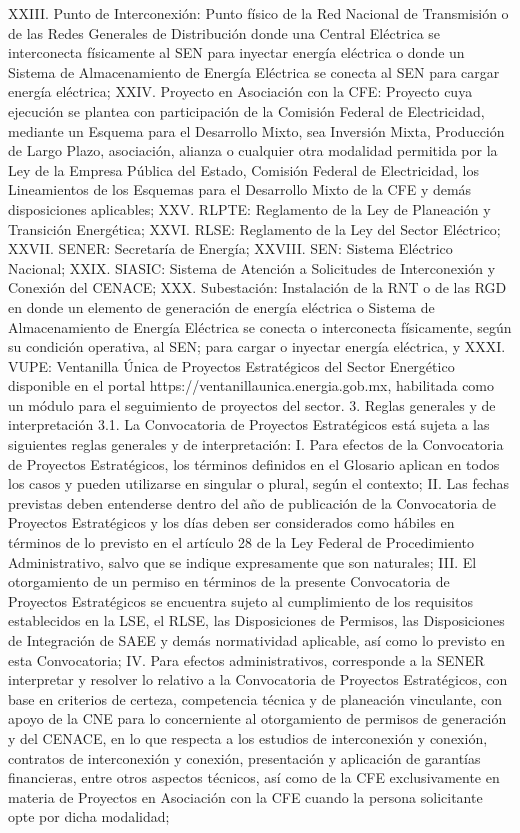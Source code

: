 XXIII. Punto de Interconexión: Punto físico de la Red Nacional de Transmisión o de las Redes Generales de Distribución donde una Central Eléctrica se interconecta físicamente al SEN para inyectar energía eléctrica o donde un Sistema de Almacenamiento de Energía Eléctrica se conecta al SEN para cargar energía eléctrica;
XXIV. Proyecto en Asociación con la CFE: Proyecto cuya ejecución se plantea con participación de la Comisión Federal de Electricidad, mediante un Esquema para el Desarrollo Mixto, sea Inversión Mixta, Producción de Largo Plazo, asociación, alianza o cualquier otra modalidad permitida por la Ley de la Empresa Pública del Estado, Comisión Federal de Electricidad, los Lineamientos de los Esquemas para el Desarrollo Mixto de la CFE y demás disposiciones aplicables;
XXV. RLPTE: Reglamento de la Ley de Planeación y Transición Energética;
XXVI. RLSE: Reglamento de la Ley del Sector Eléctrico;
XXVII. SENER: Secretaría de Energía;
XXVIII. SEN: Sistema Eléctrico Nacional;
XXIX. SIASIC: Sistema de Atención a Solicitudes de Interconexión y Conexión del CENACE;
XXX. Subestación: Instalación de la RNT o de las RGD en donde un elemento de generación de energía eléctrica o Sistema de Almacenamiento de Energía Eléctrica se conecta o interconecta físicamente, según su condición operativa, al SEN; para cargar o inyectar energía eléctrica, y
XXXI. VUPE: Ventanilla Única de Proyectos Estratégicos del Sector Energético disponible en el portal https://ventanillaunica.energia.gob.mx, habilitada como un módulo para el seguimiento de proyectos del sector.
3. Reglas generales y de interpretación
3.1. La Convocatoria de Proyectos Estratégicos está sujeta a las siguientes reglas generales y de interpretación:
I. Para efectos de la Convocatoria de Proyectos Estratégicos, los términos definidos en el Glosario aplican en todos los casos y pueden utilizarse en singular o plural, según el contexto;
II. Las fechas previstas deben entenderse dentro del año de publicación de la Convocatoria de Proyectos Estratégicos y los días deben ser considerados como hábiles en términos de lo previsto en el artículo 28 de la Ley Federal de Procedimiento Administrativo, salvo que se indique expresamente que son naturales;
III. El otorgamiento de un permiso en términos de la presente Convocatoria de Proyectos Estratégicos se encuentra sujeto al cumplimiento de los requisitos establecidos en la LSE, el RLSE, las Disposiciones de Permisos, las Disposiciones de Integración de SAEE y demás normatividad aplicable, así como lo previsto en esta Convocatoria;
IV. Para efectos administrativos, corresponde a la SENER interpretar y resolver lo relativo a la Convocatoria de Proyectos Estratégicos, con base en criterios de certeza, competencia técnica y de planeación vinculante, con apoyo de la CNE para lo concerniente al otorgamiento de permisos de generación y del CENACE, en lo que respecta a los estudios de interconexión y conexión, contratos de interconexión y conexión, presentación y aplicación de garantías financieras, entre otros aspectos técnicos, así como de la CFE exclusivamente en materia de Proyectos en Asociación con la CFE cuando la persona solicitante opte por dicha modalidad;
